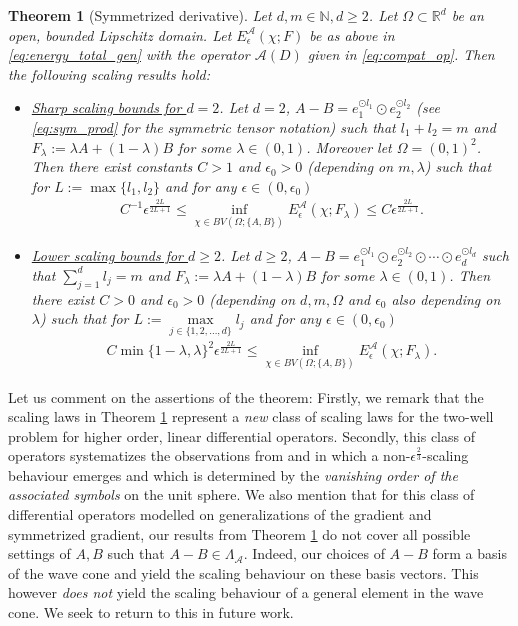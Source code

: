 \documentclass[a4paper, 10pt, twoside, notitlepage]{amsart}
\theoremstyle{plain}
\newtheorem{thm}{Theorem}
\newcommand{\R}{\mathbb{R}}
\newcommand{\N}{\mathbb{N}}
\newcommand{\A}{\mathcal{A}}
\begin{document}
	\begin{thm}[Symmetrized derivative]
		\label{thm:scaling_2D_new}
		Let $d,m \in \N, d \geq 2$. Let $\Omega \subset \R^d$ be an open, bounded Lipschitz domain. Let $E_{\epsilon}^{\A}(\chi;F)$ be as above in \eqref{eq:energy_total_gen}  with the operator $\A(D)$ given in \eqref{eq:compat_op}. Then the following scaling results hold:
		\begin{itemize}
			\item \underline{Sharp scaling bounds for $d=2$}. Let $d=2$, $A-B = e_1^{\odot l_1} \odot e_2^{\odot l_2}$ (see \eqref{eq:sym_prod} for the symmetric
			tensor notation) such that $l_1 + l_2 =m$ and $F_{\lambda}:= \lambda A + (1-\lambda ) B$ for some $\lambda \in (0,1)$.  Moreover let $\Omega = (0,1)^2$. Then there exist constants
			$C>1$ and $\epsilon_0 > 0$ (depending on $m, \lambda$) such that for $L:= \max\{l_1, l_2\}$ and for any $\epsilon \in (0,\epsilon_0)$
			\begin{align*}
				C^{-1} \epsilon^{\frac{2L}{2L+1}} \leq \inf\limits_{\chi \in BV(\Omega;\{A,B\})} E_{\epsilon}^{\A}(\chi; F_{\lambda}) \leq C \epsilon^{\frac{2L}{2L+1}}.
			\end{align*}
			\item \underline{Lower scaling bounds for $d\geq 2$}. Let $d\geq 2$, $A-B = e_1^{\odot l_1} \odot e_2^{\odot l_2} \odot \cdots \odot e_d^{\odot l_d}$ such
			that $\sum_{j = 1}^{d} l_{j} = m$ and $F_{\lambda}:= \lambda A + (1-\lambda ) B$ for some $\lambda \in (0,1)$. Then there exist $C>0$ and $\epsilon_0>0$ (depending on $d, m, \Omega$ and $\epsilon_0$ also depending on $\lambda$) such
			that for $L:=\max\limits_{j\in\{1,2,\dots,d\}}l_j$ and for any $\epsilon \in (0,\epsilon_0)$
			\begin{align*}
				C \min\{1-\lambda,\lambda\}^2\epsilon^{\frac{2L}{2L+1}} \leq \inf\limits_{\chi \in BV(\Omega;\{A,B\})} E_{\epsilon}^{\A}(\chi; F_{\lambda}) .
			\end{align*}
		\end{itemize}
	\end{thm}
	
	Let us comment on the assertions of the theorem: Firstly, we remark that the scaling laws in Theorem \ref{thm:scaling_2D_new} represent a \emph{new} class of scaling laws for the two-well
	problem for higher order, linear differential operators. Secondly, this class of operators systematizes the observations from \cite{CC15} and \cite[Section 3.4]{RRT22} in which a
	non-$\epsilon^{\frac{2}{3}}$-scaling behaviour emerges and which is determined by the \emph{vanishing order of the associated symbols} on the unit sphere.
        We also mention that for this class of differential operators modelled on generalizations of the gradient and symmetrized gradient, our results from Theorem \ref{thm:scaling_2D_new} do not
	cover all possible settings of $A,B $ such that $A-B \in \Lambda_{\A}$. Indeed, our choices of $A-B$ form a basis of the wave cone and yield the scaling behaviour on these basis
	vectors. This however \emph{does not} yield the scaling behaviour of a general element in the wave cone. We seek to return to this in future work.
\end{document}
